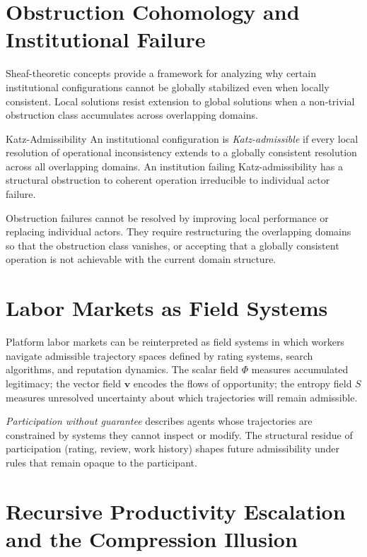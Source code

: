 \section{Obstruction Cohomology and Institutional Failure}

\claimC Sheaf-theoretic concepts provide a framework for analyzing why certain
institutional configurations cannot be globally stabilized even when locally
consistent. Local solutions resist extension to global solutions when a
non-trivial obstruction class accumulates across overlapping domains.

\begin{definition}{Katz-Admissibility}
An institutional configuration is \emph{Katz-admissible} if every local
resolution of operational inconsistency extends to a globally consistent resolution
across all overlapping domains. An institution failing Katz-admissibility has a
structural obstruction to coherent operation irreducible to individual actor failure.
\end{definition}

\claimC Obstruction failures cannot be resolved by improving local performance or
replacing individual actors. They require restructuring the overlapping domains
so that the obstruction class vanishes, or accepting that a globally consistent
operation is not achievable with the current domain structure.

\section{Labor Markets as Field Systems}

\claimP Platform labor markets can be reinterpreted as field systems in which
workers navigate admissible trajectory spaces defined by rating systems, search
algorithms, and reputation dynamics. The scalar field $\Phi$ measures accumulated
legitimacy; the vector field $\mathbf{v}$ encodes the flows of opportunity; the
entropy field $S$ measures unresolved uncertainty about which trajectories will
remain admissible.

\emph{Participation without guarantee} describes agents whose trajectories are
constrained by systems they cannot inspect or modify. The structural residue of
participation (rating, review, work history) shapes future admissibility under
rules that remain opaque to the participant.

\section{Recursive Productivity Escalation and the Compression Illusion}
\label{sec:ai_labor}

